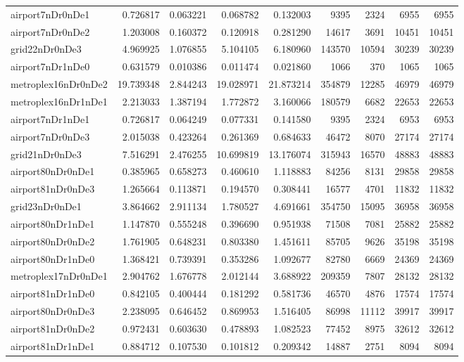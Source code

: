 \begin{longtable}{|l|r|r|r|r|r|r|r|r|}
airport7nDr0nDe1 & 0.726817 & 0.063221 & 0.068782 & 0.132003 & 9395 & 2324 & 6955 & 6955 \\
airport7nDr0nDe2 & 1.203008 & 0.160372 & 0.120918 & 0.281290 & 14617 & 3691 & 10451 & 10451 \\
grid22nDr0nDe3 & 4.969925 & 1.076855 & 5.104105 & 6.180960 & 143570 & 10594 & 30239 & 30239 \\
airport7nDr1nDe0 & 0.631579 & 0.010386 & 0.011474 & 0.021860 & 1066 & 370 & 1065 & 1065 \\
metroplex16nDr0nDe2 & 19.739348 & 2.844243 & 19.028971 & 21.873214 & 354879 & 12285 & 46979 & 46979 \\
metroplex16nDr1nDe1 & 2.213033 & 1.387194 & 1.772872 & 3.160066 & 180579 & 6682 & 22653 & 22653 \\
airport7nDr1nDe1 & 0.726817 & 0.064249 & 0.077331 & 0.141580 & 9395 & 2324 & 6953 & 6953 \\
airport7nDr0nDe3 & 2.015038 & 0.423264 & 0.261369 & 0.684633 & 46472 & 8070 & 27174 & 27174 \\
grid21nDr0nDe3 & 7.516291 & 2.476255 & 10.699819 & 13.176074 & 315943 & 16570 & 48883 & 48883 \\
airport80nDr0nDe1 & 0.385965 & 0.658273 & 0.460610 & 1.118883 & 84256 & 8131 & 29858 & 29858 \\
airport81nDr0nDe3 & 1.265664 & 0.113871 & 0.194570 & 0.308441 & 16577 & 4701 & 11832 & 11832 \\
grid23nDr0nDe1 & 3.864662 & 2.911134 & 1.780527 & 4.691661 & 354750 & 15095 & 36958 & 36958 \\
airport80nDr1nDe1 & 1.147870 & 0.555248 & 0.396690 & 0.951938 & 71508 & 7081 & 25882 & 25882 \\
airport80nDr0nDe2 & 1.761905 & 0.648231 & 0.803380 & 1.451611 & 85705 & 9626 & 35198 & 35198 \\
airport80nDr1nDe0 & 1.368421 & 0.739391 & 0.353286 & 1.092677 & 82780 & 6669 & 24369 & 24369 \\
metroplex17nDr0nDe1 & 2.904762 & 1.676778 & 2.012144 & 3.688922 & 209359 & 7807 & 28132 & 28132 \\
airport81nDr1nDe0 & 0.842105 & 0.400444 & 0.181292 & 0.581736 & 46570 & 4876 & 17574 & 17574 \\
airport80nDr0nDe3 & 2.238095 & 0.646452 & 0.869953 & 1.516405 & 86998 & 11112 & 39917 & 39917 \\
airport81nDr0nDe2 & 0.972431 & 0.603630 & 0.478893 & 1.082523 & 77452 & 8975 & 32612 & 32612 \\
airport81nDr1nDe1 & 0.884712 & 0.107530 & 0.101812 & 0.209342 & 14887 & 2751 & 8094 & 8094 \\

\end{longtable}
